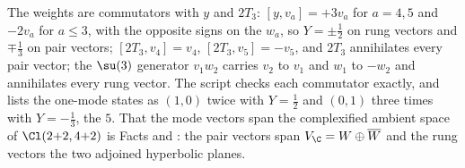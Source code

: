 The weights are commutators with $y$ and $2T_{3}$: $[y, v_{a}] = +3v_{a}$ for $a = 4, 5$ and $-2v_{a}$ for $a \le 3$, with the opposite signs on the $w_{a}$, so $Y = \pm\tfrac12$ on rung vectors and $\mp\tfrac13$ on pair vectors; $[2T_{3}, v_{4}] = v_{4}$, $[2T_{3}, v_{5}] = -v_{5}$, and $2T_{3}$ annihilates every pair vector; the $\su(3)$ generator $v_{1}w_{2}$ carries $v_{2}$ to $v_{1}$ and $w_{1}$ to $-w_{2}$ and annihilates every rung vector. The script checks each commutator exactly, and lists the one-mode states as $(1,0)$ twice with $Y = \tfrac12$ and $(0,1)$ three times with $Y = -\tfrac13$, the $5$. That the mode vectors span the complexified ambient space of $\Cl(2{+}2, 4{+}2)$ is Facts  and : the pair vectors span $V_{\C} = W \oplus \overline{W}$ and the rung vectors the two adjoined hyperbolic planes.
